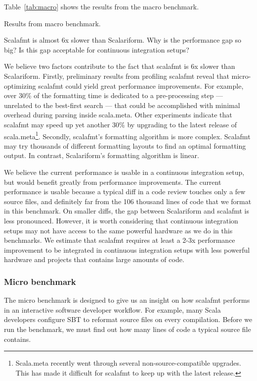 Table~\ref{tab:macro} shows the results from the macro benchmark.
\begin{table}
  \centering
  \caption{Results from macro benchmark.}\label{tab:macro}
  
\end{table}
Scalafmt is almost 6x slower than Scalariform.
Why is the performance gap so big?
Is this gap acceptable for continuous integration setups?

We believe two factors contribute to the fact that scalafmt is 6x slower than Scalariform.
Firstly, preliminary results from profiling scalafmt reveal that micro-optimizing scalafmt could yield great performance improvements.
For example, over 30\% of the formatting time is dedicated to a pre-processing step --- unrelated to the best-first search --- that could be accomplished with minimal overhead during parsing inside scala.meta.
Other experiments indicate that scalafmt may speed up yet another 30\% by upgrading to the latest release of scala.meta\footnote{
  Scala.meta recently went through several non-source-compatible upgrades.
  This has made it difficult for scalafmt to keep up with the latest release.
}.
Secondly, scalafmt's formatting algorithm is more complex.
Scalafmt may try thousands of different formatting layouts to find an optimal formatting output.
In contrast, Scalariform's formatting algorithm is linear.

We believe the current performance is usable in a continuous integration setup, but would benefit greatly from performance improvements.
The current performance is usable because a typical diff in a code review touches only a few source files, and definitely far from the 106 thousand lines of code that we format in this benchmark.
On smaller diffs, the gap between Scalariform and scalafmt is less pronounced.
However, it is worth considering that continuous integration setups may not have access to the same powerful hardware as we do in this benchmarks.
We estimate that scalafmt requires at least a 2-3x performance improvement to be integrated in continuous integration setups with less powerful hardware and projects that contains large amounts of code.


\subsubsection{Micro benchmark}
The micro benchmark is designed to give us an insight on how scalafmt performs in an interactive software developer workflow.
For example, many Scala developers configure SBT to reformat source files on every compilation.
Before we run the benchmark, we must find out how many lines of code a typical source file contains.

